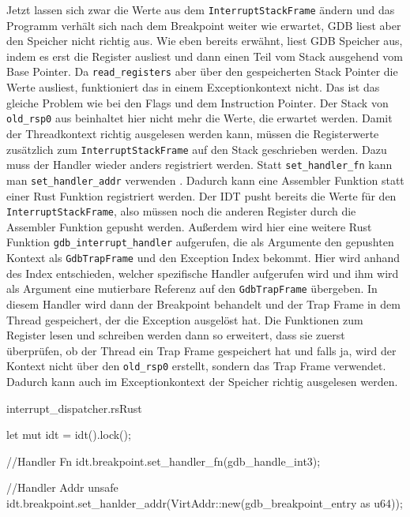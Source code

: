 Jetzt lassen sich zwar die Werte aus dem \texttt{InterruptStackFrame} ändern und das Programm verhält sich nach dem Breakpoint weiter wie erwartet, GDB liest aber den Speicher nicht richtig aus. Wie eben bereits erwähnt, liest GDB Speicher aus, indem es erst die Register ausliest und dann einen Teil vom Stack ausgehend vom Base Pointer. Da \texttt{read\_registers} aber über den gespeicherten Stack Pointer die Werte ausliest, funktioniert das in einem Exceptionkontext nicht. Das ist das gleiche Problem wie bei den Flags und dem Instruction Pointer. Der Stack von \texttt{old\_rsp0} aus beinhaltet hier nicht mehr die Werte, die erwartet werden. Damit der Threadkontext richtig ausgelesen werden kann, müssen die Registerwerte zusätzlich zum \texttt{InterruptStackFrame} auf den Stack geschrieben werden. Dazu muss der Handler wieder anders registriert werden. Statt \texttt{set\_handler\_fn} kann man \texttt{set\_handler\_addr} verwenden \cite{x86-64}. Dadurch kann eine Assembler Funktion statt einer Rust Funktion registriert werden. Der IDT pusht bereits die Werte für den \texttt{InterruptStackFrame}, also müssen noch die anderen Register durch die Assembler Funktion gepusht werden. Außerdem wird hier eine weitere Rust Funktion \texttt{gdb\_interrupt\_handler} aufgerufen, die als Argumente den gepushten Kontext als \texttt{GdbTrapFrame} und den Exception Index bekommt. Hier wird anhand des Index entschieden, welcher spezifische Handler aufgerufen wird und ihm wird als Argument eine mutierbare Referenz auf den \texttt{GdbTrapFrame} übergeben. In diesem Handler wird dann der Breakpoint behandelt und der Trap Frame in dem Thread gespeichert, der die Exception ausgelöst hat. Die Funktionen zum Register lesen und schreiben werden dann so erweitert, dass sie zuerst überprüfen, ob der Thread ein Trap Frame gespeichert hat und falls ja, wird der Kontext nicht über den \texttt{old\_rsp0} erstellt, sondern das Trap Frame verwendet. Dadurch kann auch im Exceptionkontext der Speicher richtig ausgelesen werden.

\begin{codeblock}{interrupt\_dispatcher.rs}{Rust}
\begin{rustcode}
let mut idt = idt().lock();

//Handler Fn
idt.breakpoint.set_handler_fn(gdb_handle_int3);

//Handler Addr
unsafe {
	idt.breakpoint.set_hanlder_addr(VirtAddr::new(gdb_breakpoint_entry as u64));
}
\end{rustcode}
\end{codeblock}

